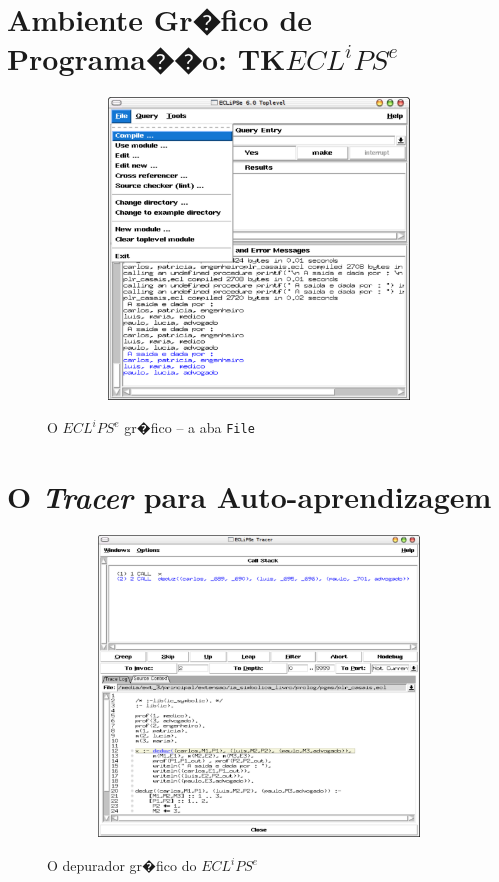 \documentclass[final,a4paper]{article}
\begin{document}
 \section{Ambiente Gr�fico de Programa��o:  TK$ECL^iPS^e$}

\begin{figure}[!htb]
\centering
\includegraphics[width=14cm, height=8cm]{figuras/tkeclipse_3.pdf}
\label{fig_tk_03}
\caption{O $ECL^iPS^e$ gr�fico -- a aba \texttt{File}}
\end{figure}


\section{O {\em Tracer} para Auto-aprendizagem}


\begin{figure}[!htb]
\centering
\includegraphics[width=14cm, height=8cm]{figuras/tkeclipse_2.pdf}
\label{tk_tracer}
\caption{O depurador gr�fico do $ECL^iPS^e$}
\end{figure}
\end{document}
